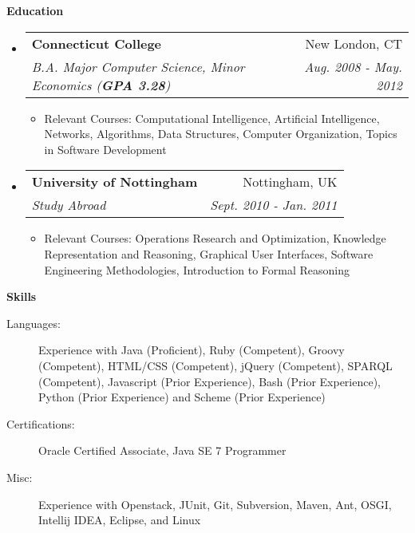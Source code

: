 \documentclass[letterpaper,11pt]{article}
\makeatletter
\newcommand{\resitem}[1]{\item #1 \vspace{-2pt}}
\newcommand{\resheading}[1]{{\large \colorbox{mygrey}{\begin{minipage}{\textwidth}{\textbf{#1 \vphantom{p\^{E}}}}\end{minipage}}}}
\newcommand{\ressubheading}[4]{
\begin{tabular*}{7.0in}{l@{\extracolsep{\fill}}r}
		\textbf{#1} & #2 \\
		\textit{#3} & \textit{#4} \\
\end{tabular*}\vspace{-6pt}}
\makeatother
\begin{document}
\resheading{Education}
\begin{itemize}
	\item
	\ressubheading{Connecticut College}{New London, CT}{B.A. Major Computer Science, Minor Economics (\textbf{GPA 3.28})}{Aug. 2008 - May. 2012}
	\begin{itemize}
		\resitem{Relevant Courses: Computational Intelligence, Artificial Intelligence, Networks, Algorithms, Data Structures, Computer Organization, Topics in Software Development}
	\end{itemize}
	
	\item
	\ressubheading{University of Nottingham}{Nottingham, UK}{Study Abroad}{Sept. 2010 - Jan. 2011}
	\begin{itemize}
		\resitem{Relevant Courses: Operations Research and Optimization, Knowledge Representation and Reasoning, Graphical User Interfaces, Software Engineering Methodologies, Introduction to Formal Reasoning}
	\end{itemize}
\end{itemize}

\resheading{Skills}
\begin{description}
	\item[Languages:]
		Experience with Java (Proficient), Ruby (Competent), Groovy (Competent), HTML/CSS (Competent), jQuery (Competent), SPARQL (Competent), Javascript (Prior Experience), Bash (Prior Experience), Python (Prior Experience) and Scheme (Prior Experience)
	\item[Certifications:]
		Oracle Certified Associate, Java SE 7 Programmer
	\item[Misc:]
		Experience with Openstack, JUnit, Git, Subversion, Maven, Ant, OSGI, Intellij IDEA, Eclipse, and Linux
\end{description}
\end{document}
